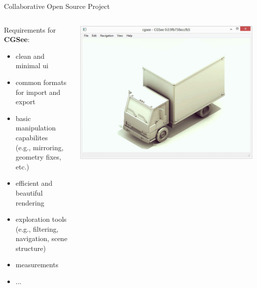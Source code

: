\begin{frame}{Collaborative Open Source Project}

	\begin{columns}
		\begin{column}{0.5\textwidth}

			Requirements for \textbf{CGSee}:
			\bigskip

			\begin{itemize}
				\item clean and minimal ui
				\item common formats for import and export
				\item basic manipulation capabilites\\(e.g., mirroring, geometry fixes, etc.)
				\item efficient and beautiful rendering
				\item exploration tools\\(e.g., filtering, navigation, scene structure)
				\item measurements
				\item ...
			\end{itemize}	
			
		\end{column}
		\begin{column}{0.5\textwidth}

			\includegraphics[width=\textwidth]{intro/mock_06}
			
		\end{column}
	\end{columns}

\end{frame}


